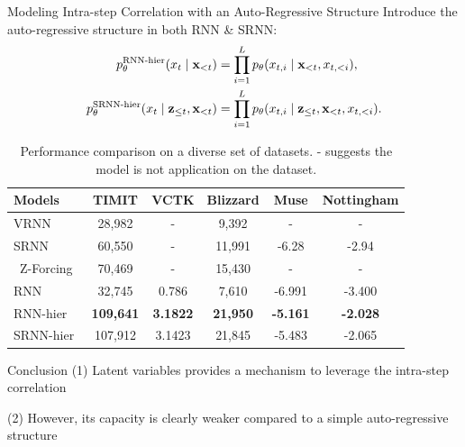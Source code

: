 \documentclass[final]{beamer}
\newlength{\colwidth}
\begin{document}
\begin{frame}[t]
\begin{columns}[t]
\begin{column}{\colwidth}
\begin{block}{Modeling Intra-step Correlation with an Auto-Regressive Structure}
	Introduce the auto-regressive structure in both RNN \& SRNN:
	\begin{align}
	\label{eqn:ar_rnn_out_dist}
	p_\theta^\text{RNN-hier}(x_t \mid {\mathbf{x}}_{<t})
	&= \prod_{i=1}^{L} p_{\theta}(x_{t,i} \mid {\mathbf{x}}_{<t}, x_{t,<i}), \\
	\label{eqn:ar_srnn_out_dist}
	p_\theta^\text{SRNN-hier}(x_t \mid {\mathbf{z}}_{\le t}, {\mathbf{x}}_{<t})
	&= \prod_{i=1}^{L} p_{\theta}(x_{t,i} \mid {\mathbf{z}}_{\le t}, {\mathbf{x}}_{<t}, x_{t,<i}).
	\end{align}
	\begin{table}[!t]
		\centering
		\small
		\begin{tabular}{l|c c c | c c }
			\toprule
			\bf Models          & \bf TIMIT & \bf VCTK  & \bf Blizzard  & \bf Muse  & \bf Nottingham \\
			\midrule
			VRNN~\cite{chung2015recurrent}      & 28,982      & -          & 9,392      &  -         &  -      \\
			SRNN~\cite{fraccaro2016sequential}      & 60,550      & -          & 11,991     &  -6.28     &  -2.94     \\\
			Z-Forcing~\cite{goyal2017z}  & 70,469 & -          & 15,430     &  -         &  -       \\
			\midrule
			RNN               & 32,745      & 0.786      & 7,610     & -6.991     & -3.400     \\
			\midrule\midrule
			RNN-hier            & \textbf{109,641}     & \textbf{3.1822}     & \textbf{21,950}     & \textbf{-5.161} & \textbf{-2.028} \\
			SRNN-hier           & 107,912     & 3.1423     & 21,845     & -5.483     & -2.065    \\
			\bottomrule
		\end{tabular}
		\caption{Performance comparison on a diverse set of datasets. - suggests the model is not application on the dataset. }
		\label{tab:non_factorized}
		\vspace{-1.5em}
	\end{table}
	\vspace{-1.0em}
\end{block}

\begin{block}{Conclusion}
	(1) Latent variables provides a mechanism to leverage the intra-step correlation
	
	(2) However, its capacity is clearly weaker compared to a simple auto-regressive structure
\end{block}


\end{column}
\end{columns}
\end{frame}
\end{document}
